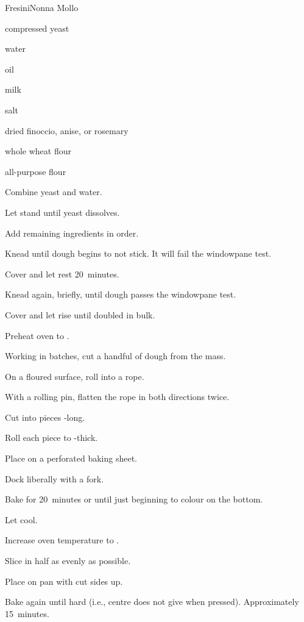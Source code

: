 \begin{recipe}{Fresini}{Nonna Mollo}{}

\begin{ingredients}
\item {} compressed yeast
\item {} water
\item {} oil
\item {} milk
\item {} salt
\item \tp{\half} dried finoccio, anise, or rosemary
\item {} whole wheat flour
\item {} all-purpose flour
\end{ingredients}

\begin{directions}
\item Combine yeast and water.
\item Let stand until yeast dissolves.
\item Add remaining ingredients in order.
\item Knead until dough begins to not stick. It will fail the windowpane test.
\item Cover and let rest 20~minutes.
\item Knead again, briefly, until dough passes the windowpane test.
\item Cover and let rise until doubled in bulk.
\item Preheat oven to .
\item Working in batches, cut a handful of dough from the mass.
\item On a floured surface, roll into a rope.
\item With a rolling pin, flatten the rope in both directions twice.
\item Cut into pieces -long.
\item Roll each piece to \inch{\quarter}-thick.
\item Place on a perforated baking sheet.
\item Dock liberally with a fork.
\item Bake for 20~minutes or until just beginning to colour on the bottom.
\item Let cool.
\item Increase oven temperature to .
\item Slice in half as evenly as possible.
\item Place on pan with cut sides up.
\item Bake again until hard (i.e., centre does not give when pressed). Approximately 15~minutes.
\end{directions}

\end{recipe}
